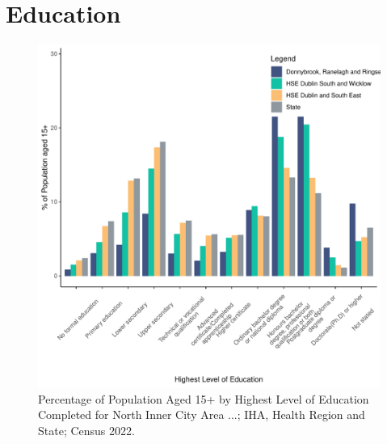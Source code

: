 \documentclass{article}
\begin{document}
\section{Education}\label{sect:Edu}
\begin{figure}[H]
	\centering
	\includegraphics[width = 120mm]{../figures/EduED.pdf}
	\caption{Percentage of Population Aged 15+ by Highest Level of Education Completed for North Inner City Area ...; IHA, Health Region and State; Census 2022.}
	\label{fig:vbnv}
	\end{figure}
\end{document}
